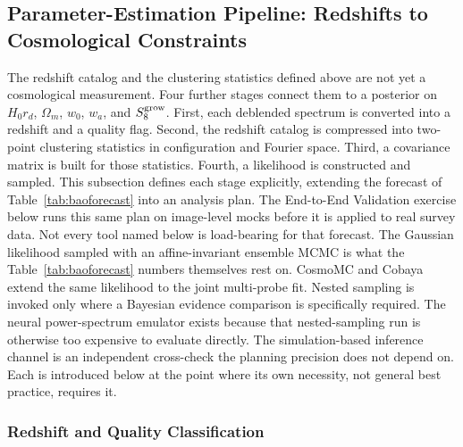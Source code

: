 \documentclass[10pt,onecolumn]{article}
\begin{document}
\subsection{Parameter-Estimation Pipeline: Redshifts to Cosmological Constraints}

The redshift catalog and the clustering statistics defined above are not yet a cosmological measurement. Four further stages connect them to a posterior on $H_0r_d$, $\Omega_m$, $w_0$, $w_a$, and $S_8^{\rm grow}$. First, each deblended spectrum is converted into a redshift and a quality flag. Second, the redshift catalog is compressed into two-point clustering statistics in configuration and Fourier space. Third, a covariance matrix is built for those statistics. Fourth, a likelihood is constructed and sampled. This subsection defines each stage explicitly, extending the forecast of Table~\ref{tab:baoforecast} into an analysis plan. The End-to-End Validation exercise below runs this same plan on image-level mocks before it is applied to real survey data. Not every tool named below is load-bearing for that forecast. The Gaussian likelihood sampled with an affine-invariant ensemble MCMC is what the Table~\ref{tab:baoforecast} numbers themselves rest on. CosmoMC and Cobaya extend the same likelihood to the joint multi-probe fit. Nested sampling is invoked only where a Bayesian evidence comparison is specifically required. The neural power-spectrum emulator exists because that nested-sampling run is otherwise too expensive to evaluate directly. The simulation-based inference channel is an independent cross-check the planning precision does not depend on. Each is introduced below at the point where its own necessity, not general best practice, requires it.

\subsubsection{Redshift and Quality Classification}
\end{document}
